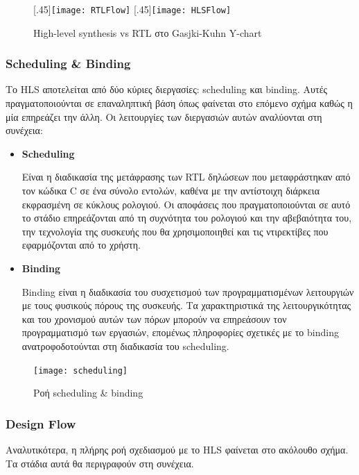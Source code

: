 \begin{figure}[H]
\centering
{}%
  [.45\linewidth]{\texttt{[image: RTLFlow]}}
  [.45\linewidth]{\texttt{[image: HLSFlow]}}
  \caption{High-level synthesis vs RTL στο Gasjki-Kuhn Y-chart \cite{Meeus2012}}
    \label{fig:hlsrtl}
\end{figure}

\subsubsection{Scheduling \& Binding}
Το HLS αποτελείται από δύο κύριες διεργασίες: scheduling και binding. Αυτές πραγματοποιούνται σε επαναληπτική βάση όπως φαίνεται στο επόμενο σχήμα καθώς η μία επηρεάζει την άλλη. Οι λειτουργίες των διεργασιών αυτών αναλύονται στη συνέχεια:
\begin{itemize}[label={},leftmargin=*]
	\item{\textbf{Scheduling}}

Είναι η διαδικασία της μετάφρασης των RTL δηλώσεων που μεταφράστηκαν από τον κώδικα C σε ένα σύνολο εντολών, καθένα με την αντίστοιχη διάρκεια εκφρασμένη σε κύκλους ρολογιού. Οι αποφάσεις που πραγματοποιούνται σε αυτό το στάδιο επηρεάζονται από τη συχνότητα του ρολογιού και την αβεβαιότητα του, την τεχνολογία της συσκευής που θα χρησιμοποιηθεί και τις ντιρεκτίβες που εφαρμόζονται από το χρήστη. \\

	\item{\textbf{Binding}}

Binding είναι η διαδικασία του συσχετισμού των προγραμματισμένων λειτουργιών με τους φυσικούς πόρους της συσκευής. Τα χαρακτηριστικά της λειτουργικότητας και του χρονισμού αυτών των πόρων μπορούν να επηρεάσουν τον προγραμματισμό των εργασιών, επομένως πληροφορίες σχετικές με το binding ανατροφοδοτούνται στη διαδικασία του scheduling.
\end{itemize}
\begin{figure}[H]
  	\centering
	\texttt{[image: scheduling]}\\
	\caption{Ροή scheduling \& binding \cite{Crockett:2014:ZBE:2685817}}
	\label{fig:scheduling}
\end{figure}
\subsubsection{Design Flow}

Αναλυτικότερα, η πλήρης ροή σχεδιασμού με το HLS φαίνεται στο ακόλουθο σχήμα. Τα στάδια αυτά θα περιγραφούν στη συνέχεια.

